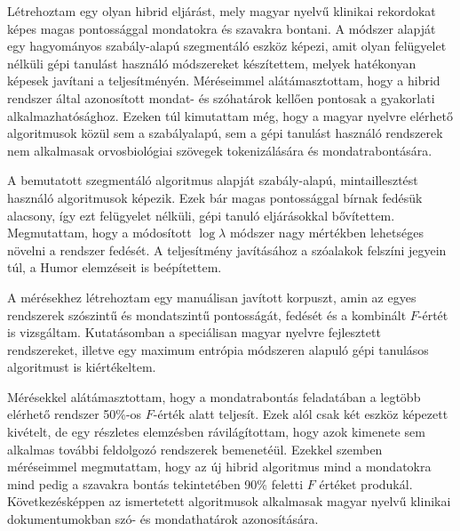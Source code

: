 % 
% 



\begin{core}
\begin{thesis}%
\label{thes:clin-segment}
Létrehoztam egy olyan hibrid eljárást, mely magyar nyelvű klinikai rekordokat képes magas pontossággal mondatokra és szavakra bontani. 
A módszer alapját egy hagyományos szabály-alapú szegmentáló eszköz képezi, amit olyan felügyelet nélküli gépi tanulást használó módszereket készítettem, melyek hatékonyan képesek javítani a teljesítményén.
Méréseimmel alátámasztottam, hogy a hibrid rendszer által azonosított mondat- és szóhatárok kellően pontosak a gyakorlati alkalmazhatósághoz.
Ezeken túl kimutattam még, hogy a magyar nyelvre elérhető algoritmusok közül sem a szabályalapú, sem a gépi tanulást használó rendszerek nem alkalmasak orvosbiológiai szövegek tokenizálására és mondatrabontására.
\end{thesis}

\begin{pub}
\cite{Orosz2013d, Orosz2014a}
\end{pub}
\end{core}

A bemutatott szegmentáló algoritmus alapját szabály-alapú, mintaillesztést használó algoritmusok képezik. 
Ezek bár magas pontossággal bírnak fedésük alacsony, így ezt felügyelet nélküli, gépi tanuló eljárásokkal bővítettem.
Megmutattam, hogy a módosított $\log \lambda$ módszer nagy mértékben lehetséges növelni a rendszer fedését. 
A teljesítmény javításához a szóalakok felszíni jegyein túl, a Humor elemzéseit is beépítettem.


A mérésekhez létrehoztam egy manuálisan javított korpuszt, amin az egyes rendszerek szószintű és mondatszintű pontosságát, fedését és a kombinált $F$-értét is vizsgáltam.  
Kutatásomban a speciálisan magyar nyelvre fejlesztett rendszereket, illetve egy maximum entrópia módszeren alapuló gépi tanulásos algoritmust is kiértékeltem.

Mérésekkel alátámasztottam, hogy a mondatrabontás feladatában a legtöbb elérhető rendszer 50\%-os $F$-érték alatt teljesít. 
Ezek alól csak két eszköz képezett kivételt, de egy részletes elemzésben rávilágítottam, hogy azok kimenete sem alkalmas további feldolgozó rendszerek bemenetéül.
Ezekkel szemben méréseimmel megmutattam, hogy az új hibrid algoritmus mind a mondatokra mind pedig a szavakra bontás tekintetében 90\% feletti $F$ értéket produkál. 
Következésképpen az ismertetett algoritmusok alkalmasak magyar nyelvű klinikai dokumentumokban szó- és mondathatárok azonosítására.

